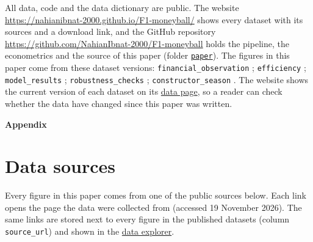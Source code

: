 \documentclass[11pt,a4paper]{article}
\newcommand{\site}{https://nahianibnat-2000.github.io/F1-moneyball}
\newcommand{\repo}{https://github.com/NahianIbnat-2000/F1-moneyball}
\newcommand{\sitepage}[2]{\href{\site/#1}{#2}}
\newcommand{\code}[1]{\href{\repo/blob/main/#1}{\nolinkurl{#1}}}
\begin{document}
All data, code and the data dictionary are public. The website \url{\site/} shows every dataset with its sources and a
download link, and the GitHub repository \url{\repo} holds the pipeline, the econometrics and the source of this paper
(folder \code{paper}). The figures in this paper come from these dataset versions:
\texttt{financial\_observation} \VerFinancialObservation; \texttt{efficiency} \VerEfficiency;
\texttt{model\_results} \VerModelResults; \texttt{robustness\_checks} \VerRobustnessChecks;
\texttt{constructor\_season} \VerConstructorSeason. The website shows the current version of each dataset on its
\sitepage{data}{data page}, so a reader can check whether the data have changed since this paper was written.

\clearpage
\setlength{\bibitemsep}{0.9\baselineskip}   %
\setlength{\bibhang}{1.5em}                 %
\setcounter{biburlnumpenalty}{9000}          %
\setcounter{biburllcpenalty}{9000}
\setcounter{biburlucpenalty}{9000}
\printbibliography[heading=centred]

\clearpage
\appendix
\begin{center}
  {\Large\bfseries Appendix}
\end{center}
\vspace{0.5em}
\section{Data sources}
\label{app:sources}

\noindent Every figure in this paper comes from one of the public sources below. Each link opens the page the data were
collected from (accessed 19 November 2026). The same links are stored next to every figure in the published datasets
(column \texttt{source\_url}) and shown in the \sitepage{data}{data explorer}.
\end{document}
